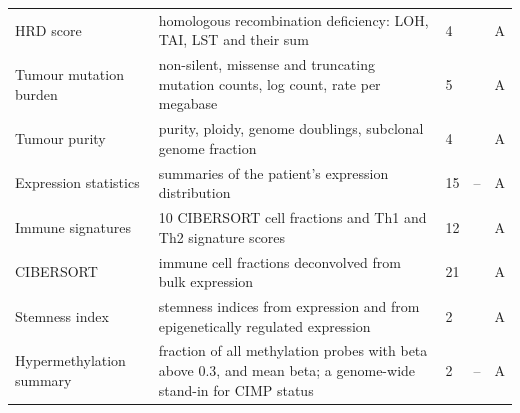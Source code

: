 \begin{longtable}{p{3.2cm}p{5.6cm}p{1.6cm}p{1.6cm}p{1.4cm}}
HRD score & homologous recombination deficiency: LOH, TAI, LST and their sum & 4 & \citep{Knijnenburg2018} & A \\
Tumour mutation burden & non-silent, missense and truncating mutation counts, log count, rate per megabase & 5 & \citep{Ellrott2018} & A \\
Tumour purity & purity, ploidy, genome doublings, subclonal genome fraction & 4 & \citep{Carter2012} & A \\
Expression statistics & summaries of the patient's expression distribution & 15 & -- & A \\
Immune signatures & 10 CIBERSORT cell fractions and Th1 and Th2 signature scores & 12 & \citep{Thorsson2018} & A \\
CIBERSORT & immune cell fractions deconvolved from bulk expression & 21 & \citep{Newman2015, Thorsson2018} & A \\
Stemness index & stemness indices from expression and from epigenetically regulated expression & 2 & \citep{Malta2018} & A \\
Hypermethylation summary & fraction of all methylation probes with beta above 0.3, and mean beta; a genome-wide stand-in for CIMP status \citep{Toyota1999} & 2 & -- & A \\
\end{longtable}

